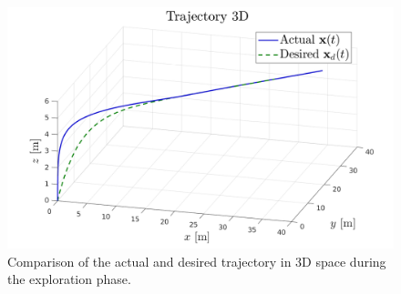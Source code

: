\begin{figure}[h!]
    \centering
    \includegraphics[width=1\textwidth]{images/traj_comparison.png}
    \caption[3D Trajectory Tracking]{Comparison of the actual and desired trajectory in 3D space during the exploration phase.}
    \label{fig:pd_traj_comparison}
\end{figure}

